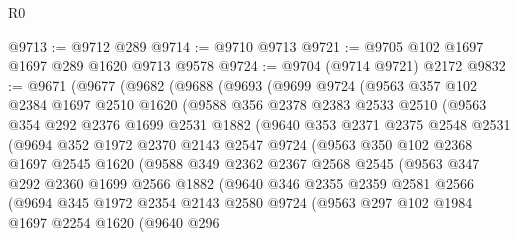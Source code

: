 \begin{lexlean}{R0}
\begin{coremodule}
@9713 := @9712 @289
@9714 := @9710 @9713
@9721 := @9705 @102 @1697 @1697 @289 @1620 @9713 @9578
@9724 := @9704 (@9714 @9721) @2172
@9832 := @9671
    (@9677
      (@9682
        (@9688
          (@9693
            (@9699
              @9724
              (@9563
                @357
                @102
                @2384
                @1697
                @2510
                @1620
                (@9588
                  @356
                  @2378
                  @2383
                  @2533
                  @2510
                  (@9563
                    @354
                    @292
                    @2376
                    @1699
                    @2531
                    @1882
                    (@9640
                      @353
                      @2371
                      @2375
                      @2548
                      @2531
                      (@9694
                        @352
                        @1972
                        @2370
                        @2143
                        @2547
                        @9724
                        (@9563
                          @350
                          @102
                          @2368
                          @1697
                          @2545
                          @1620
                          (@9588
                            @349
                            @2362
                            @2367
                            @2568
                            @2545
                            (@9563
                              @347
                              @292
                              @2360
                              @1699
                              @2566
                              @1882
                              (@9640
                                @346
                                @2355
                                @2359
                                @2581
                                @2566
                                (@9694
                                  @345
                                  @1972
                                  @2354
                                  @2143
                                  @2580
                                  @9724
                                  (@9563
                                    @297
                                    @102
                                    @1984
                                    @1697
                                    @2254
                                    @1620
                                    (@9640
                                      @296

\end{coremodule}
\end{lexlean}
